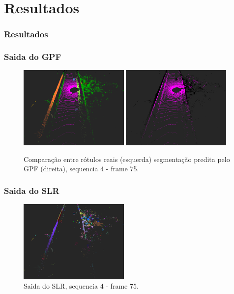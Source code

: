 \documentclass[aspectratio=169,t,xcolor=table]{beamer}
\begin{document}
\section{Resultados}

\begin{frame}
    \frametitle{Resultados}
\end{frame}

\begin{frame}
    \frametitle{Saida do GPF}
    \begin{figure}
        \centering
        \includegraphics[width=0.48\textwidth]{figs/label_2_s4f75.png}
        \hspace{0.02\textwidth}
        \includegraphics[width=0.48\textwidth]{figs/gpf_2_s4f75.png}
        \caption {Comparação entre rótulos reais (esquerda) segmentação predita
            pelo GPF (direita), sequencia 4 - frame 75.}
    \end{figure}
\end{frame}

\begin{frame}
    \frametitle{Saida do SLR}
    \begin{figure}
        \centering
        \includegraphics[width=0.48\textwidth]{figs/slr_2_s4f75.png}
        \caption {Saida do SLR, sequencia 4 - frame 75.}
    \end{figure}
\end{frame}
\end{document}
